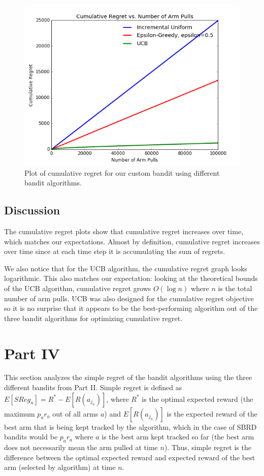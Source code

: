 \documentclass[paper=a4, fontsize=11pt]{scrartcl}
\begin{document}
\begin{figure}
\centering
	\includegraphics[width=1\linewidth]{custom_bandit_cumulative_regret.png}
\caption{Plot of cumulative regret for our custom bandit using different bandit algorithms.}
\label{fig:cumulative_bandit3}
\end{figure}

\subsection{Discussion}

The cumulative regret plots show that cumulative regret increases over time, which matches our expectations. Almost by definition, cumulative regret increases over time since at each time step it is accumulating the sum of regrets.

We also notice that for the UCB algorithm, the cumulative regret graph looks logarithmic. This also matches our expectation: looking at the theoretical bounds of the UCB algorithm, cumulative regret grows $O(\log n)$ where $n$ is the total number of arm pulls. UCB was also designed for the cumulative regret  objective so it is no surprise that it appears to be the best-performing algorithm out of the three bandit algorithms for optimizing cumulative regret.

\section{Part IV}

This section analyzes the simple regret of the bandit algorithms using the three different bandits from Part II. Simple regret is defined as $E[SReg_n] = R^{*} - E[R(a_{j_n})]$, where $R^{*}$ is the optimal expected reward (the maximum $p_a r_a$ out of all arms $a$) and $E[R(a_{j_n})]$ is the expected reward of the best arm that is being kept tracked by the algorithm, which in the case of SBRD bandits would be $p_a r_a$ where $a$ is the best arm kept tracked so far (the best arm does not necessarily mean the arm pulled at time $n$). Thus, simple regret is the difference between the optimal expected reward and expected reward of the best arm (selected by algorithm) at time $n$.
\end{document}
